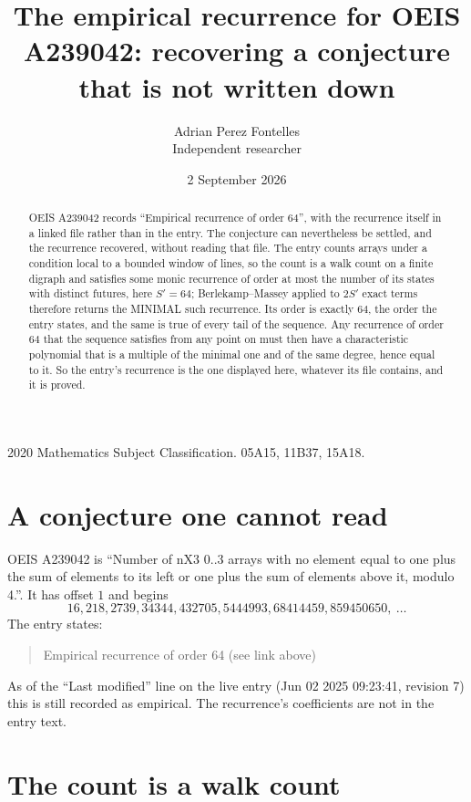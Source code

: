 \documentclass[11pt,a4paper]{article}
\title{The empirical recurrence for OEIS A239042: recovering a conjecture that is not written down}
\author{Adrian Perez Fontelles\\ \small Independent researcher}
\date{2 September 2026}
\theoremstyle{plain}
\theoremstyle{definition}
\begin{document}
\maketitle

\begin{abstract}
OEIS A239042 records ``Empirical recurrence of order $64$'', with the recurrence itself in a
linked file rather than in the entry. The conjecture can nevertheless be settled, and the
recurrence recovered, without reading that file. The entry counts arrays under a condition
local to a bounded window of lines, so the count is a walk count on a finite digraph and
satisfies some monic recurrence of order at most the number of its states with distinct
futures, here $S'=64$; Berlekamp--Massey applied to $2S'$ exact
terms therefore returns the MINIMAL such recurrence. Its order is exactly $64$, the order
the entry states, and the same is true of every tail of the sequence. Any recurrence of order
$64$ that the sequence satisfies from any point on must then have a characteristic
polynomial that is a multiple of the minimal one and of the same degree, hence equal to it. So
the entry's recurrence is the one displayed here, whatever its file contains, and it is
proved.
\end{abstract}

\noindent\small 2020 Mathematics Subject Classification. 05A15, 11B37, 15A18.\normalsize

\section{A conjecture one cannot read}

OEIS A239042 is ``Number of nX3 0..3 arrays with no element equal to one plus the sum of elements to its left or one plus the sum of elements above it, modulo 4.''. It has offset $1$ and begins
\[
16, 218, 2739, 34344, 432705, 5444993, 68414459, 859450650,\ \dots
\]
The entry states:
\begin{quote}
Empirical recurrence of order 64 (see link above)
\end{quote}
As of the ``Last modified'' line on the live entry (Jun 02 2025 09:23:41, revision 7) this is still
recorded as empirical. The recurrence's coefficients are not in the entry text.

\section{The count is a walk count}
\end{document}
